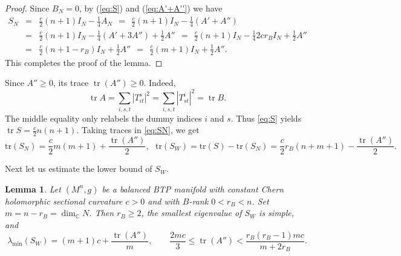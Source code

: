 \documentclass{amsart}
\newtheorem{lemma}{Lemma}
\newcommand{\C}{{\mathbb C}}
\begin{document}
\begin{proof}
Since $B_N=0$, by (\ref{eq:S}) and (\ref{eq:A'+A''}) we have
\begin{eqnarray*}
 S_N &= & \frac{c}{2}(n+1)I_N -\frac{1}{4}A_N \ \ = \ \ \frac{c}{2}(n+1)I_N  -\frac{1}{4}(A'+A'') \\
 & = & \frac{c}{2}(n+1)I_N  -\frac{1}{4}(A'+3A'') + \frac{1}{2} A'' \ \ = \ \ \frac{c}{2}(n+1)I_N  -\frac{1}{4}2cr_BI_N + \frac{1}{2} A'' \\
 & = & \frac{c}{2}(n+1-r_B)I_N  + \frac{1}{2} A'' \ \ = \ \ \frac{c}{2}(m+1)I_N  + \frac{1}{2} A''.
 \end{eqnarray*}
 This completes the proof of the lemma.
\end{proof}

Since $A''\geq 0$, its trace $\operatorname{tr}(A'')\geq 0$.
  Indeed,
\begin{equation}\label{eq:traceAB}
\operatorname{tr}A
=\sum_{i,s,t}|T^s_{it}|^2
=\sum_{i,s,t}|T^i_{st}|^2
=\operatorname{tr}B.
\end{equation}
The middle equality only relabels the dummy indices $i$ and $s$.
Thus \eqref{eq:S} yields
$\operatorname{tr}S=\frac{c}{2}n(n+1)$. Taking traces in
\eqref{eq:SN},  we get
\begin{equation} \label{eq:traceSN}
\mbox{tr}(S_N) = \frac{c}{2}m(m+1) + \frac{\operatorname{tr}(A'')}{2}, \ \ \  \mbox{tr}(S_W) = \mbox{tr}(S) -\mbox{tr}(S_N)=\frac{c}{2}r_B(n+m+1) - \frac{\operatorname{tr}(A'')}{2} .
\end{equation}


Next let us estimate the lower bound of $S_W$.
\begin{lemma} \label{lemma-SWmin}
Let $(M^n,g)$ be a balanced BTP manifold with  constant  Chern
holomorphic sectional curvature  $c>0$ and with $B$-rank
$0<r_B<n$.   Set $m=n-r_B=\dim_{\C}N$. Then  $r_B\geq 2$, the smallest
eigenvalue of $S_W$ is simple, and
\begin{equation} \label{eq:SWmin}
 \lambda_{\min}(S_W)
 = (m+1)c+\frac{\operatorname{tr}(A'')}{m},
 \qquad
 \frac{2mc}{3}\leq\operatorname{tr}(A'')
 <\frac{r_B(r_B-1)mc}{m+2r_B}.
\end{equation}
 \end{lemma}
\end{document}
